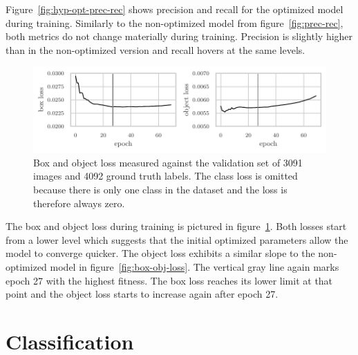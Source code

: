 \documentclass[draft,final]{vutinfth} %
\begin{document}
Figure~\ref{fig:hyp-opt-prec-rec} shows precision and recall for the
optimized model during training. Similarly to the non-optimized model
from figure~\ref{fig:prec-rec}, both metrics do not change materially
during training. Precision is slightly higher than in the
non-optimized version and recall hovers at the same levels.

\begin{figure}
  \centering
  \includegraphics{graphics/val_box_obj_loss_final.pdf}
  \caption[Hyper-parameter optimized object detection box and object
  loss.]{Box and object loss measured against the validation set of
    \num{3091} images and \num{4092} ground truth labels. The class
    loss is omitted because there is only one class in the dataset and
    the loss is therefore always zero.}
  \label{fig:hyp-opt-box-obj-loss}
\end{figure}

The box and object loss during training is pictured in
figure~\ref{fig:hyp-opt-box-obj-loss}. Both losses start from a lower
level which suggests that the initial optimized parameters allow the
model to converge quicker. The object loss exhibits a similar slope to
the non-optimized model in figure~\ref{fig:box-obj-loss}. The vertical
gray line again marks epoch \num{27} with the highest fitness. The box
loss reaches its lower limit at that point and the object loss starts
to increase again after epoch \num{27}.

\section{Classification}
\label{sec:development-classification}
\end{document}
